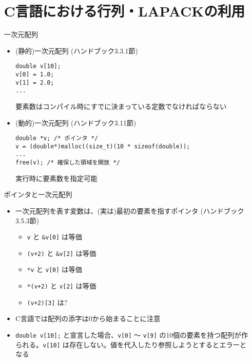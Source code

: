 \section{C言語における行列・LAPACKの利用}

\begin{frame}[t,fragile]{一次元配列}
  \begin{itemize}
    \setlength{\itemsep}{1em}
  \item (静的)一次元配列 (ハンドブック3.3.1節)
\begin{lstlisting}
double v[10];
v[0] = 1.0;
v[1] = 2.0;
...
\end{lstlisting}
    要素数はコンパイル時にすでに決まっている定数でなければならない
  \item (動的)一次元配列 (ハンドブック3.11節)
\begin{lstlisting}
double *v; /* ポインタ */
v = (double*)malloc((size_t)(10 * sizeof(double));
...
free(v); /* 確保した領域を開放 */
\end{lstlisting}
実行時に要素数を指定可能
  \end{itemize}
\end{frame}

\begin{frame}[t,fragile]{ポインタと一次元配列}
  \begin{itemize}
    \setlength{\itemsep}{1em}
  \item 一次元配列を表す変数は、(実は)最初の要素を指すポインタ  (ハンドブック3.5.3節)
    \begin{itemize}
    \item \verb+v+ と \verb+&v[0]+ は等価
    \item \verb^(v+2)^ と \verb^&v[2]^ は等価
    \item \verb+*v+ と \verb+v[0]+ は等価
    \item \verb^*(v+2)^ と \verb^v[2]^ は等価
    \item \verb^(v+2)[3]^ は?
    \end{itemize}
  \item C言語では配列の添字は0から始まることに注意
  \item \verb^double v[10];^ と宣言した場合、\verb^v[0]^ 〜 \verb^v[9]^ の10個の要素を持つ配列が作られる。\verb^v[10]^ は存在しない。値を代入したり参照しようとするとエラーとなる
  \end{itemize}
\end{frame}


